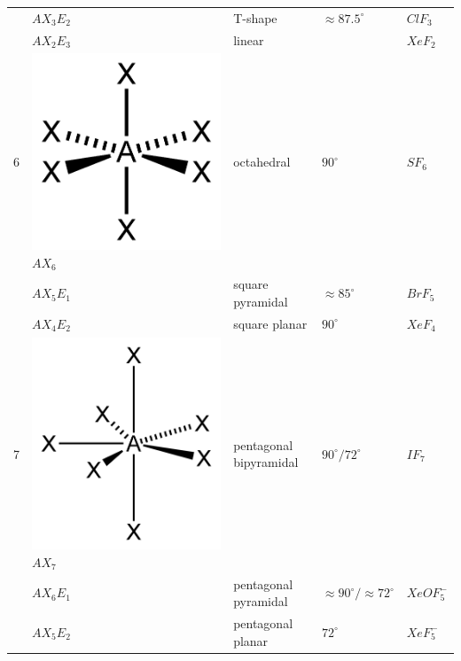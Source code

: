 \documentclass[ wastespaceontitle, english]{cheat_sheet_template}
\begin{document}
\begin{longtable}{lllll}
            &  \centering
                 $AX_3E_2$
                  &  T-shape &  $\approx 87.5^\circ$ & $ClF_3$ \\
            &  \centering
                $AX_2E_3$
                & linear &  & $XeF_2$  \\
                \hline
            6&  \centering
                 \includegraphics[width = 0.2\linewidth]{edomaingeo/AX6E0-2D.png} 
                 $AX_6$
                  & octahedral &  $90^\circ$ & $SF_6$ \\
            &  \centering
                 $AX_5E_1$
                  & square pyramidal &  $\approx 85^\circ$ & $BrF_5$  \\
            &  \centering
                 $AX_4E_2$
                  & square planar &  $90^\circ$ &  $XeF_4$ \\
                \hline
            7&  \centering
                 \includegraphics[width = 0.2\linewidth]{edomaingeo/AX7E0-2D.png} 
                 $AX_7$
                  & pentagonal bipyramidal  & $90^\circ/ 72^\circ$ & $IF_7$\\
           
            &  \centering
                 $AX_6E_1$
                  & pentagonal pyramidal & $\approx 90^\circ/ \approx 72^\circ$ &  $XeOF_5^-$  \\
            &  \centering
                 $AX_5E_2$
                  & pentagonal planar & $72^\circ$ & $XeF_5^-$  \\
                  \hline
\end{longtable} 
\end{document}
